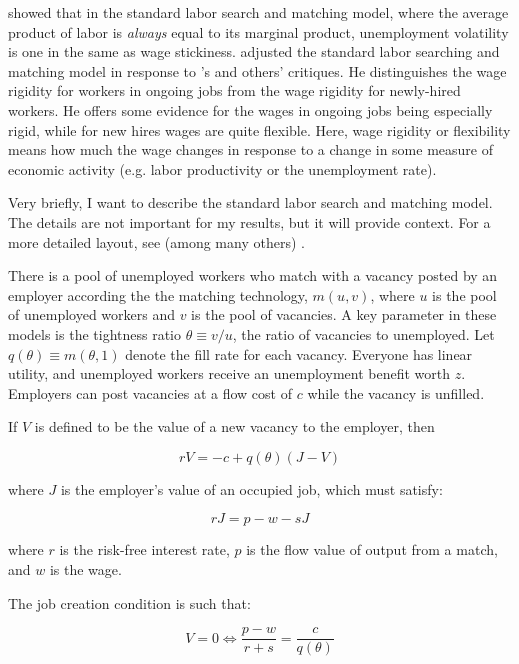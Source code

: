 \documentclass[11pt]{article}
\begin{document}
\cite{hall_milgrom_2008} showed that in the standard labor search and matching model, where the average product of labor is \emph{always} equal to its marginal product, unemployment volatility is one in the same as wage stickiness.
\cite{pissarides_2009} adjusted the standard labor searching and matching model in response to \cite{shimer_2005}'s and others' critiques.
He distinguishes the wage rigidity for workers in ongoing jobs from the wage rigidity for newly-hired workers.
He offers some evidence for the wages in ongoing jobs being especially rigid, while for new hires wages are quite flexible.
Here, wage rigidity or flexibility means how much the wage changes in response to a change in some measure of economic activity (e.g. labor productivity or the unemployment rate).

Very briefly, I want to describe the standard labor search and matching model.
The details are not important for my results, but it will provide context.
For a more detailed layout, see (among many others) \cite{pissarides_2009}.

There is a pool of unemployed workers who match with a vacancy posted by an employer according the the matching technology, $m(u, v)$,
where $u$ is the pool of unemployed workers and $v$ is the pool of vacancies.
A key parameter in these models is the tightness ratio $\theta \equiv v/u$, the ratio of vacancies to unemployed.
Let $q(\theta) \equiv m(\theta, 1)$ denote the fill rate for each vacancy.
Everyone has linear utility, and unemployed workers receive an unemployment benefit worth $z$.
Employers can post vacancies at a flow cost of $c$ while the vacancy is unfilled.

If $V$ is defined to be the value of a new vacancy to the employer, then

\begin{equation}
    rV = -c + q(\theta)(J - V)
\end{equation}

where $J$ is the employer's value of an occupied job, which must satisfy:

\begin{equation}
    rJ = p - w - sJ
\end{equation}

where $r$ is the risk-free interest rate, $p$ is the flow value of output from a match, and $w$ is the wage.

The job creation condition is such that:

\begin{equation}
    V = 0 \iff \frac{p - w}{r + s} = \frac{c}{q(\theta)}
\end{equation}
\end{document}
